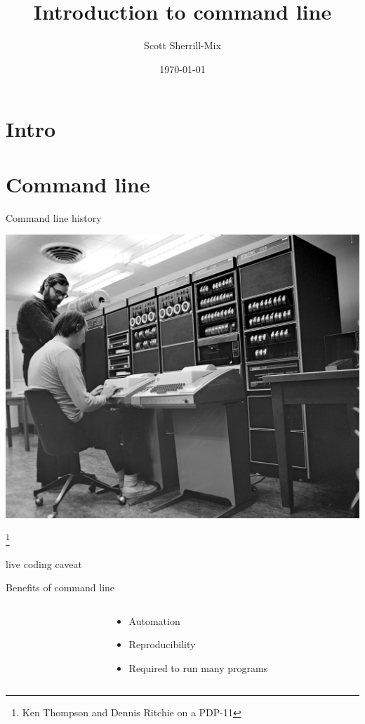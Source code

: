 \documentclass[xcolor=table]{beamer}
\title{\LARGE Introduction to command line}%
\author{\vspace{-.2in}Scott Sherrill-Mix\vspace{-.4in}}
\date{\today\vspace{-.5in}}
\begin{document}
{
\frame[plain]{\vspace{-.3in}\titlepage}
}

\section{Intro}
\section{Command line}
\begin{frame}{Command line history}
\begin{center}
\includegraphics[width=.7\textwidth]{im/Ken_Thompson_(sitting)_and_Dennis_Ritchie_at_PDP-11_(2876612463).jpg}
\end{center}
\footnote{Ken Thompson and Dennis Ritchie on a PDP-11}
\end{frame}
\begin{frame}
\begin{center}
\Huge live coding caveat
\end{center}
\end{frame}

\begin{frame}{Benefits of command line}
\Large
\begin{columns}
\begin{column}{.2\textwidth}
\vspace{.1in}
\end{column}
\begin{column}{.8\textwidth}
\begin{center}
\begin{itemize}
\item Automation
\item Reproducibility
\item Required to run many programs
\end{itemize}
\end{center}
\end{column}
\end{columns}
\end{frame}
\end{document}

